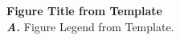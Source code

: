 \caption{\textbf{
Figure Title from Template
}
\smallskip
\\
\textbf{\textit{A.}} Figure Legend from Template.
}
